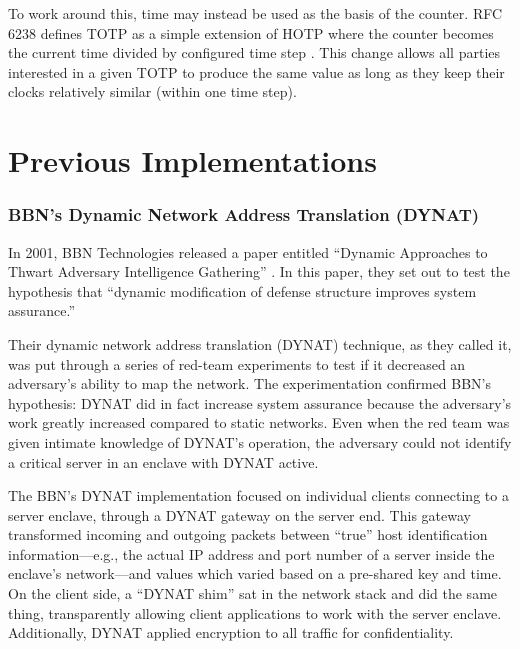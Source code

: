 \par To work around this, time may instead be used as the basis of the counter. RFC 6238 defines \ac{TOTP} as a simple extension of \ac{HOTP} where the counter becomes the current time divided by configured time step \cite{rfc6238}. This change allows all parties interested in a given \ac{TOTP} to produce the same value as long as they keep their clocks relatively similar (within one time step). 

\section{Previous Implementations}
\label{sec:related_research}


\subsubsection{BBN's Dynamic Network Address Translation (DYNAT)}
\par In 2001, BBN Technologies released a paper entitled ``Dynamic Approaches to Thwart Adversary Intelligence Gathering'' \cite{BBNDYNAT}. In this paper, they set out to test the hypothesis that ``dynamic modification of defense structure improves system assurance.''

\par Their dynamic network address translation (DYNAT) technique, as they called it, was put through a series of red-team experiments to test if it decreased an adversary's ability to map the network. The experimentation confirmed BBN's hypothesis: DYNAT did in fact increase system assurance because the adversary's work greatly increased compared to static networks. Even when the red team was given intimate knowledge of DYNAT's operation, the adversary could not identify a critical server in an enclave with DYNAT active.

\par The BBN's DYNAT implementation focused on individual clients connecting to a server enclave, through a DYNAT gateway on the server end. This gateway transformed incoming and outgoing packets between ``true'' host identification information---e.g., the actual IP address and port number of a server inside the enclave's network---and values which varied based on a pre-shared key and time. On the client side, a ``DYNAT shim'' sat in the network stack and did the same thing, transparently allowing client applications to work with the server enclave. Additionally, DYNAT applied encryption to all traffic for confidentiality.

